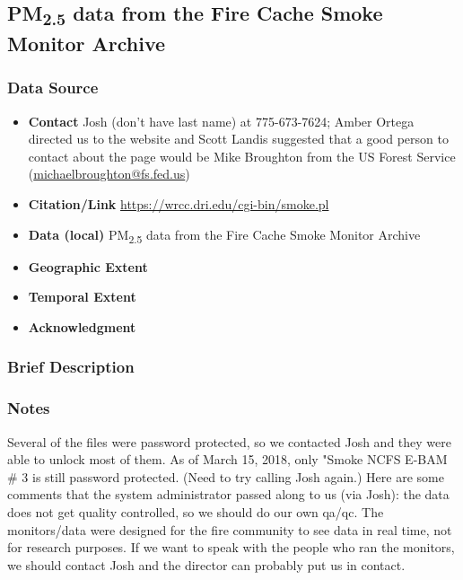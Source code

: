\subsection{\texorpdfstring{PM\textsubscript{2.5}}{} data from the Fire Cache Smoke Monitor Archive}

\subsubsection*{Data Source}

\begin{itemize}[nolistsep]
\item \textbf{Contact} Josh (don't have last name) at 775-673-7624; Amber Ortega directed us to the website and Scott Landis suggested that a good person to contact about the page would be Mike Broughton from the US Forest Service (\url{michaelbroughton@fs.fed.us})
\item \textbf{Citation/Link} \url{https://wrcc.dri.edu/cgi-bin/smoke.pl}
\item \textbf{Data (local)} PM\textsubscript{2.5} data from the Fire Cache Smoke Monitor Archive
\item \textbf{Geographic Extent} 
\item \textbf{Temporal Extent} 
\item \textbf{Acknowledgment} 
\end{itemize}

\subsubsection*{Brief Description}

\subsubsection*{Notes}

Several of the files were password protected, so we contacted Josh and they were able to unlock most of them. As of March 15, 2018, only "Smoke NCFS E-BAM \# 3 is still password protected. (Need to try calling Josh again.) Here are some comments that the system administrator passed along to us (via Josh): the data does not get quality controlled, so we should do our own qa/qc. The monitors/data were designed for the fire community to see data in real time, not for research purposes. If we want to speak with the people who ran the monitors, we should contact Josh and the director can probably put us in contact.


